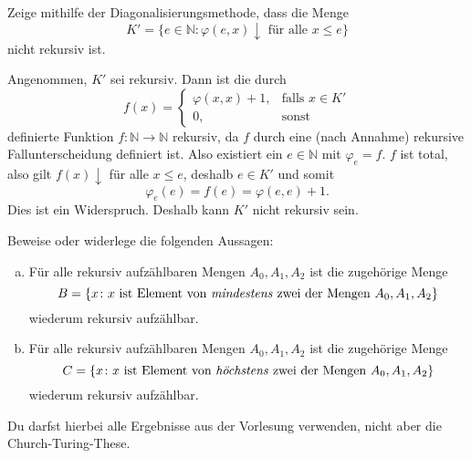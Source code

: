 \documentclass[german,headsepline]{scrartcl}
\theoremstyle{definition}
\begin{document}
	\begin{question}
		Zeige mithilfe der Diagonalisierungsmethode, dass die Menge
		\[K'=\{e\in\mathbb{N}\colon\varphi(e,x)\downarrow\text{ für alle }x\leq e\}\]
		nicht rekursiv ist.
	\end{question}
	\begin{solution}
		Angenommen, $K'$ sei rekursiv. Dann ist die durch
		\[f(x)=\begin{cases}
			\varphi(x,x)+1, &\text{falls }x\in K' \\
			0, &\text{sonst}
		\end{cases}\]
		definierte Funktion $f:\mathbb{N}\to\mathbb{N}$ rekursiv,
		da $f$ durch eine (nach Annahme) rekursive Fallunterscheidung definiert ist.
		Also existiert ein $e\in\mathbb{N}$ mit $\varphi_e=f$.
		$f$ ist total, also gilt $f(x)\downarrow$ für alle $x\leq e$, deshalb $e\in K'$ und somit
		\[\varphi_e(e)=f(e)=\varphi(e,e)+1.\]
		Dies ist ein Widerspruch. Deshalb kann $K'$ nicht rekursiv sein.
	\end{solution}
	
	\begin{question}[subtitle={Klausur 2015}]
		Beweise oder widerlege die folgenden Aussagen:
		\begin{enumerate}[(a)]
			\item Für alle rekursiv aufzählbaren Mengen $A_0,A_1,A_2$ ist die zugehörige Menge
				\[B=\{x\colon x\text{ ist Element von \emph{mindestens} zwei der Mengen }A_0,A_1,A_2\}\]
				wiederum rekursiv aufzählbar.
			\item Für alle rekursiv aufzählbaren Mengen $A_0,A_1,A_2$ ist die zugehörige Menge
				\[C=\{x\colon x\text{ ist Element von \emph{höchstens} zwei der Mengen }A_0,A_1,A_2\}\]
				wiederum rekursiv aufzählbar.
		\end{enumerate}
		Du darfst hierbei alle Ergebnisse aus der Vorlesung verwenden, nicht aber die Church-Turing-These.
	\end{question}
	
\end{document}
